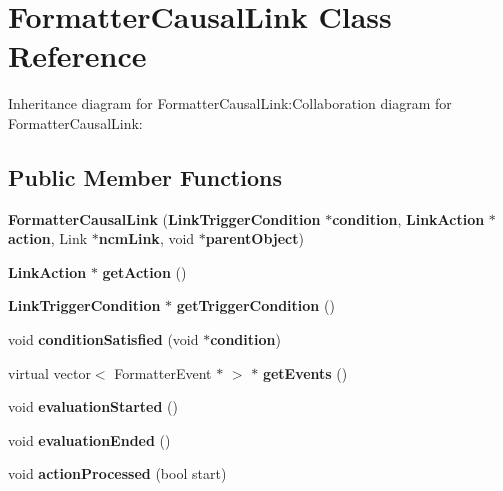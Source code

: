 \section{FormatterCausalLink Class Reference}
\label{classbr_1_1pucrio_1_1telemidia_1_1ginga_1_1ncl_1_1model_1_1link_1_1FormatterCausalLink}
Inheritance diagram for FormatterCausalLink:Collaboration diagram for FormatterCausalLink:\subsection*{Public Member Functions}
\begin{CompactItemize}
\item 
\textbf{FormatterCausalLink} ({\bf LinkTriggerCondition} $\ast${\bf condition}, {\bf LinkAction} $\ast${\bf action}, Link $\ast${\bf ncmLink}, void $\ast${\bf parentObject})\label{classbr_1_1pucrio_1_1telemidia_1_1ginga_1_1ncl_1_1model_1_1link_1_1FormatterCausalLink_2bfc448f9b8193c2b16877bdffa82e1d}

\item 
{\bf LinkAction} $\ast$ \textbf{getAction} ()\label{classbr_1_1pucrio_1_1telemidia_1_1ginga_1_1ncl_1_1model_1_1link_1_1FormatterCausalLink_edd9578aea3ef893c6d52fba36c1713a}

\item 
{\bf LinkTriggerCondition} $\ast$ \textbf{getTriggerCondition} ()\label{classbr_1_1pucrio_1_1telemidia_1_1ginga_1_1ncl_1_1model_1_1link_1_1FormatterCausalLink_be248229e25fabd89e473b20f1e8c000}

\item 
void \textbf{conditionSatisfied} (void $\ast${\bf condition})\label{classbr_1_1pucrio_1_1telemidia_1_1ginga_1_1ncl_1_1model_1_1link_1_1FormatterCausalLink_dfcc7013c6ef4b69e193394a552b381c}

\item 
virtual vector$<$ FormatterEvent $\ast$ $>$ $\ast$ \textbf{getEvents} ()\label{classbr_1_1pucrio_1_1telemidia_1_1ginga_1_1ncl_1_1model_1_1link_1_1FormatterCausalLink_77d29bf7857d5b09d0ef4fb69cfc31cd}

\item 
void \textbf{evaluationStarted} ()\label{classbr_1_1pucrio_1_1telemidia_1_1ginga_1_1ncl_1_1model_1_1link_1_1FormatterCausalLink_dba15d8c1d20e06651e6ddc5feae8447}

\item 
void \textbf{evaluationEnded} ()\label{classbr_1_1pucrio_1_1telemidia_1_1ginga_1_1ncl_1_1model_1_1link_1_1FormatterCausalLink_d989631f55175df47acbd14b854a89e4}

\item 
void \textbf{actionProcessed} (bool start)\label{classbr_1_1pucrio_1_1telemidia_1_1ginga_1_1ncl_1_1model_1_1link_1_1FormatterCausalLink_b513b06891fd2a5cb513ea5628127af2}

\end{CompactItemize}
